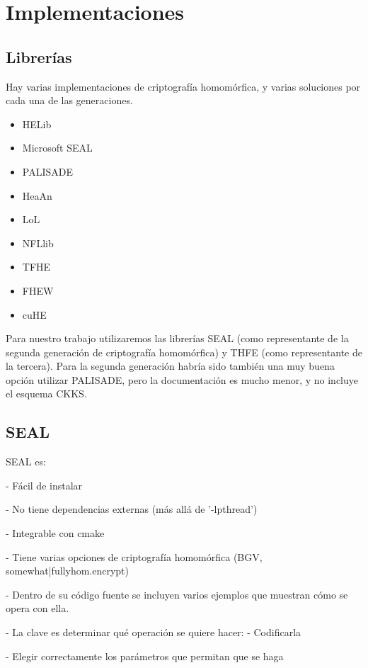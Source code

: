 \chapter{Implementaciones}
\label{chap:libs}

\section{Librerías}

Hay varias implementaciones de criptografía homomórfica, y varias soluciones por cada una de las generaciones.

\begin{itemize}
    \item HELib
    \item Microsoft SEAL
    \item PALISADE
    \item HeaAn
    \item LoL
    \item NFLlib

    \item TFHE
    \item FHEW
    \item cuHE
\end{itemize}{}

Para nuestro trabajo utilizaremos las librerías SEAL (como representante de la segunda generación de criptografía homomórfica) y THFE (como representante de la tercera). Para la segunda generación habría sido también una muy buena opción utilizar PALISADE, pero la documentación es mucho menor, y no incluye el esquema CKKS.

\section{SEAL}

SEAL es:

- Fácil de instalar

- No tiene dependencias externas (más allá de '-lpthread')

- Integrable con cmake

- Tiene varias opciones de criptografía homomórfica (BGV, {somewhat|fully}hom.encrypt)

- Dentro de su código fuente se incluyen varios ejemplos que muestran cómo se opera con ella.

- La clave es determinar qué operación se quiere hacer:
    - Codificarla

    - Elegir correctamente los parámetros que permitan que se haga

